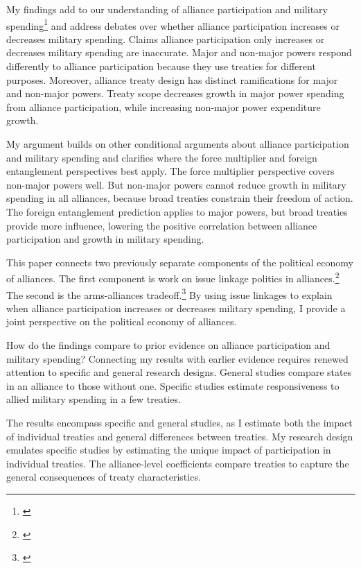 \documentclass[12pt]{article}
\begin{document}
My findings add to our understanding of alliance participation and military spending\footnote{\citep{DigiuseppePoast2016}} and address debates over whether alliance participation increases or decreases military spending. 
Claims alliance participation only increases or decreases military spending are inaccurate. 
Major and non-major powers respond differently to alliance participation because they use treaties for different purposes. 
Moreover, alliance treaty design has distinct ramifications for major and non-major powers. 
Treaty scope decreases growth in major power spending from alliance participation, while increasing non-major power expenditure growth. 


My argument builds on other conditional arguments about alliance participation and military spending and clarifies where the force multiplier and foreign entanglement perspectives best apply. 
The force multiplier perspective covers non-major powers well. 
But non-major powers cannot reduce growth in military spending in all alliances, because broad treaties constrain their freedom of action.
The foreign entanglement prediction applies to major powers, but broad treaties provide more influence, lowering the positive correlation between alliance participation and growth in military spending. 


This paper connects two previously separate components of the political economy of alliances. 
The first component is work on issue linkage politics in alliances.\footnote{\citep{Mattes2012, Poast2012, Poast2013, Johnson2015}} 
The second is the arms-alliances tradeoff.\footnote{\citep{Morrow1993}}
By using issue linkages to explain when alliance participation increases or decreases military spending, I provide a joint perspective on the political economy of alliances.  


How do the findings compare to prior evidence on alliance participation and military spending? 
Connecting my results with earlier evidence requires renewed attention to specific and general research designs. 
General studies compare states in an alliance to those without one. 
Specific studies estimate responsiveness to allied military spending in a few treaties. 


The results encompass specific and general studies, as I estimate both the impact of individual treaties and general differences between treaties. 
My research design emulates specific studies by estimating the unique impact of participation in individual treaties. 
The alliance-level coefficients compare treaties to capture the general consequences of treaty characteristics. 
\end{document}
